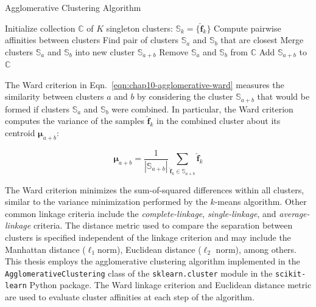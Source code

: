 \begin{algorithm}[h!]
\caption{Agglomerative Clustering Algorithm}
\label{alg:chap10-agglomerative}
\begin{algorithmic}[1]
  \State Initialize collection $\mathbb{C}$ of $K$ singleton clusters: $\mathbb{S}_{k} = \lbrace \boldsymbol{\hat{f}}_{k} \rbrace$
    \State Compute pairwise affinities between clusters 
    \State Find pair of clusters $\mathbb{S}_{a}$ and $\mathbb{S}_{b}$ that are closest %
    \State Merge clusters $\mathbb{S}_{a}$ and $\mathbb{S}_{b}$ into new cluster $\mathbb{S}_{a+b}$
    \State Remove $\mathbb{S}_{a}$ and $\mathbb{S}_{b}$ from $\mathbb{C}$
    \State Add $\mathbb{S}_{a+b}$ to $\mathbb{C}$
  \EndWhile
\end{algorithmic}
\end{algorithm}

\noindent The Ward criterion in Eqn.~\ref{eqn:chap10-agglomerative-ward} measures the similarity between clusters $a$ and $b$ by considering the cluster $\mathbb{S}_{a+b}$ that would be formed if clusters $\mathbb{S}_{a}$ and $\mathbb{S}_{b}$ were combined. In particular, the Ward criterion computes the variance of the samples $\boldsymbol{\hat{f}}_{k}$ in the combined cluster about its centroid $\boldsymbol{\mu}_{a+b}$:

\begin{equation}
\label{eqn:chap10-agglomerative-mean}
\boldsymbol{\mu}_{a+b} = \frac{1}{|\mathbb{S}_{a+b}|} \displaystyle\sum\limits_{\boldsymbol{\hat{f}}_{k} \in \mathbb{S}_{a+b}}  \boldsymbol{\hat{f}}_{k}
\end{equation}

The Ward criterion minimizes the sum-of-squared differences within all clusters, similar to the variance minimization performed by the $k$-means algorithm. Other common linkage criteria include the \textit{complete-linkage}, \textit{single-linkage}, and \textit{average-linkage} criteria. The distance metric used to compare the separation between clusters is specified independent of the linkage criterion and may include the Manhattan distance ($\ell_{1} $norm), Euclidean distance ($\ell_{2}$ norm), among others. This thesis employs the agglomerative clustering algorithm implemented in the \texttt{AgglomerativeClustering} class of the \texttt{sklearn.cluster} module in the \texttt{scikit-learn} Python package. The Ward linkage criterion and Euclidean distance metric are used to evaluate cluster affinities at each step of the algorithm.

